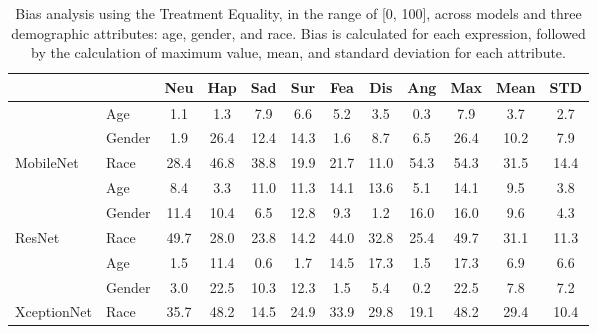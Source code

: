 \begin{table}[b] 
\caption{Bias analysis using the Treatment Equality, in the range of [0, 100], across models and three demographic attributes: age, gender, and race. Bias is calculated for each expression, followed by the calculation of maximum value, mean, and standard deviation for each attribute.}
\label{tbl:bias_treatment_equality}
\centering
\small
\setlength{\tabcolsep}{3pt} %
\resizebox{1\linewidth}{!}
{
\begin{tabular}{ll|>{\color{mediumgray}}c>{\color{mediumgray}}c>{\color{mediumgray}}c>{\color{mediumgray}}c>{\color{mediumgray}}c>{\color{mediumgray}}c>{\color{mediumgray}}c|ccc}
                                                   &        & \color{black}Neu & \color{black}Hap & \color{black}Sad 
                                                            & \color{black}Sur & \color{black}Fea & \color{black}Dis 
                                                            & \color{black}Ang & Max & Mean & STD \\ \hline
\multicolumn{1}{l|}{}                              & Age & 1.1 & 1.3 & 7.9 & 6.6 & 5.2 & 3.5 & 0.3 & 7.9 & 3.7 & 2.7\\
\multicolumn{1}{l|}{}                              & Gender & 1.9 & 26.4 & 12.4 & 14.3 & 1.6 & 8.7 & 6.5 & 26.4 & 10.2 & 7.9 \\
\multicolumn{1}{l|}{\multirow{-3}{*}{MobileNet}}   & Race & 28.4 & 46.8 & 38.8 & 19.9 & 21.7 & 11.0 & 54.3 & 54.3 & 31.5 & 14.4 \\ \hline
\multicolumn{1}{l|}{}                              & Age & 8.4 & 3.3 & 11.0 & 11.3 & 14.1 & 13.6 & 5.1 & 14.1 & 9.5 & 3.8 \\
\multicolumn{1}{l|}{}                              & Gender & 11.4 & 10.4 & 6.5 & 12.8 & 9.3 & 1.2 & 16.0 & 16.0 & 9.6 & 4.3 \\
\multicolumn{1}{l|}{\multirow{-3}{*}{ResNet}}      & Race & 49.7 & 28.0 & 23.8 & 14.2 & 44.0 & 32.8 & 25.4 & 49.7 & 31.1 & 11.3 \\ \hline
\multicolumn{1}{l|}{}                              & Age & 1.5 & 11.4 & 0.6 & 1.7 & 14.5 & 17.3 & 1.5 & 17.3 & 6.9 & 6.6 \\
\multicolumn{1}{l|}{}                              & Gender & 3.0 & 22.5 & 10.3 & 12.3 & 1.5 & 5.4 & 0.2 & 22.5 & 7.8 & 7.2 \\
\multicolumn{1}{l|}{\multirow{-3}{*}{XceptionNet}} & Race & 35.7 & 48.2 & 14.5 & 24.9 & 33.9 & 29.8 & 19.1 & 48.2 & 29.4 & 10.4 \\ \hline

\end{tabular}}
\end{table}
